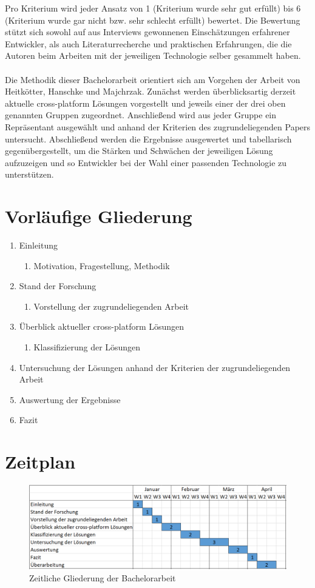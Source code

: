 Pro Kriterium wird jeder Ansatz von 1 (Kriterium wurde sehr gut erfüllt) bis 6 (Kriterium wurde gar nicht bzw. sehr schlecht erfüllt) bewertet. Die Bewertung stützt sich sowohl auf aus Interviews gewonnenen Einschätzungen erfahrener Entwickler, als auch Literaturrecherche und praktischen Erfahrungen, die die Autoren beim Arbeiten mit der jeweiligen Technologie selber gesammelt haben.\\ \\
Die Methodik dieser Bachelorarbeit orientiert sich am Vorgehen der Arbeit von Heitkötter, Hanschke und Majchrzak. Zunächst werden überblicksartig derzeit aktuelle cross-platform Lösungen vorgestellt und jeweils einer der drei oben genannten Gruppen zugeordnet. Anschließend wird aus jeder Gruppe ein Repräsentant ausgewählt und anhand der Kriterien des zugrundeliegenden Papers untersucht. Abschließend werden die Ergebnisse ausgewertet und tabellarisch gegenübergestellt, um die Stärken und Schwächen der jeweiligen Lösung aufzuzeigen und so Entwickler bei der Wahl einer passenden Technologie zu unterstützen.

\section*{Vorläufige Gliederung}

\begin{enumerate}
\item Einleitung
\begin{enumerate}[label*=\arabic*.]
\item Motivation, Fragestellung, Methodik
\end{enumerate}
\item Stand der Forschung
\begin{enumerate}[label*=\arabic*.]
\item Vorstellung der zugrundeliegenden Arbeit
\end{enumerate}
\item Überblick aktueller cross-platform Lösungen
\begin{enumerate}[label*=\arabic*.]
\item Klassifizierung der Lösungen
\end{enumerate}
\item Untersuchung der Lösungen anhand der Kriterien der zugrundeliegenden Arbeit
\item Auswertung der Ergebnisse
\item Fazit 
\end{enumerate}

 \section*{Zeitplan}
 \begin{figure}[H]
	\renewcommand*\figurename{Abbildung}
		\begin{center}
			\includegraphics[width=1\textwidth]{timetable.png}
		\end{center}
		\caption{Zeitliche Gliederung der Bachelorarbeit}
	\end{figure}